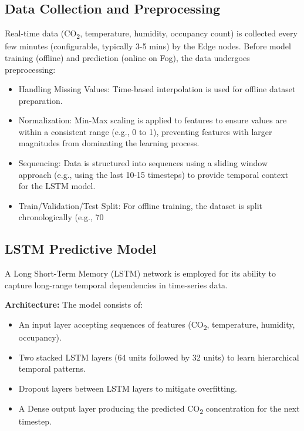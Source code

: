 \subsection{Data Collection and Preprocessing}

Real-time data (CO\textsubscript{2}, temperature, humidity, occupancy count) is collected every few minutes (configurable, typically 3-5 mins) by the Edge nodes. Before model training (offline) and prediction (online on Fog), the data undergoes preprocessing:
\begin{itemize}
    \item Handling Missing Values: Time-based interpolation is used for offline dataset preparation.
    \item Normalization: Min-Max scaling is applied to features to ensure values are within a consistent range (e.g., 0 to 1), preventing features with larger magnitudes from dominating the learning process.
    \item Sequencing: Data is structured into sequences using a sliding window approach (e.g., using the last 10-15 timesteps) to provide temporal context for the LSTM model.
    \item Train/Validation/Test Split: For offline training, the dataset is split chronologically (e.g., 70%
\end{itemize}

\subsection{LSTM Predictive Model}

A Long Short-Term Memory (LSTM) network is employed for its ability to capture long-range temporal dependencies in time-series data.

\textbf{Architecture:} The model consists of:
\begin{itemize}
    \item An input layer accepting sequences of features (CO\textsubscript{2}, temperature, humidity, occupancy).
    \item Two stacked LSTM layers (64 units followed by 32 units) to learn hierarchical temporal patterns.
    \item Dropout layers between LSTM layers to mitigate overfitting.
    \item A Dense output layer producing the predicted CO\textsubscript{2} concentration for the next timestep.
\end{itemize}

